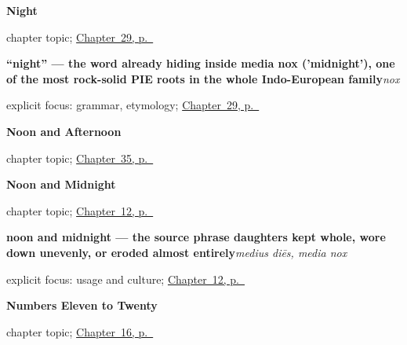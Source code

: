 \noindent\begin{minipage}[t]{\linewidth}
\raggedright
\textbf{Night}\par
\footnotesize chapter topic; \hyperref[ch:la-night]{Chapter~29, p.~\pageref*{ch:la-night}}
\end{minipage}\par\smallskip

\noindent\begin{minipage}[t]{\linewidth}
\raggedright
\textbf{\textquotedblleft{}night\textquotedblright{} — the word already hiding inside media nox ('midnight'), one of the most rock-solid PIE roots in the whole Indo-European family}\enspace\emph{nox}\par
\footnotesize explicit focus: grammar, etymology; \hyperref[ch:la-night]{Chapter~29, p.~\pageref*{ch:la-night}}
\end{minipage}\par\smallskip

\noindent\begin{minipage}[t]{\linewidth}
\raggedright
\textbf{Noon and Afternoon}\par
\footnotesize chapter topic; \hyperref[ch:la-noon-and-afternoon]{Chapter~35, p.~\pageref*{ch:la-noon-and-afternoon}}
\end{minipage}\par\smallskip

\noindent\begin{minipage}[t]{\linewidth}
\raggedright
\textbf{Noon and Midnight}\par
\footnotesize chapter topic; \hyperref[ch:la-noon-and-midnight]{Chapter~12, p.~\pageref*{ch:la-noon-and-midnight}}
\end{minipage}\par\smallskip

\noindent\begin{minipage}[t]{\linewidth}
\raggedright
\textbf{noon and midnight — the source phrase daughters kept whole, wore down unevenly, or eroded almost entirely}\enspace\emph{medius diēs, media nox}\par
\footnotesize explicit focus: usage and culture; \hyperref[ch:la-noon-and-midnight]{Chapter~12, p.~\pageref*{ch:la-noon-and-midnight}}
\end{minipage}\par\smallskip

\noindent\begin{minipage}[t]{\linewidth}
\raggedright
\textbf{Numbers Eleven to Twenty}\par
\footnotesize chapter topic; \hyperref[ch:la-numbers-eleven-to-twenty]{Chapter~16, p.~\pageref*{ch:la-numbers-eleven-to-twenty}}
\end{minipage}\par\smallskip

